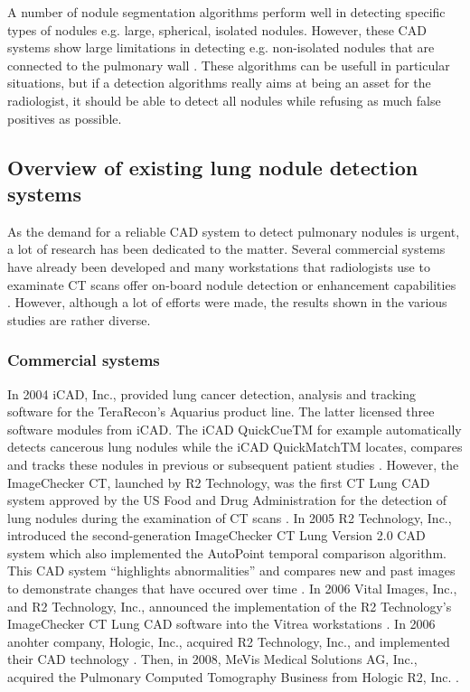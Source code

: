 A number of nodule segmentation algorithms perform well in detecting specific
types of nodules e.g. large, spherical, isolated nodules. However, these CAD
systems show large limitations in detecting e.g. non-isolated nodules that are
connected to the pulmonary wall \cite{keshani}. These algorithms can be usefull
in particular situations, but if a detection algorithms really aims at being an
asset for the radiologist, it should be able to detect all nodules while
refusing as much false positives as possible.

\subsection{Overview of existing lung nodule detection systems}
As the demand for a reliable CAD system to detect pulmonary nodules is urgent, a
lot of research has been dedicated to the matter. Several commercial systems
have already been developed and many workstations that radiologists use to
examinate CT scans offer on-board nodule detection or enhancement capabilities
\cite{ginneken}. However, although a lot of efforts were made, the results shown
in the various studies are rather diverse.

\subsubsection{Commercial systems}
In 2004 iCAD, Inc., provided lung cancer detection, analysis and tracking
software for the TeraRecon's Aquarius product line. The latter licensed three
software modules from iCAD. The iCAD QuickCueTM for example automatically
detects cancerous lung nodules while the iCAD QuickMatchTM locates, compares and tracks these
nodules in previous or subsequent patient studies \cite{tera}.
However, the ImageChecker CT, launched by R2 Technology, was the first CT Lung
CAD system approved by the US Food and Drug Administration for the detection of
lung nodules during the examination of CT scans \cite{Mevis}. In 2005 R2
Technology, Inc., introduced the second-generation ImageChecker CT Lung Version 2.0 CAD system which also implemented the AutoPoint temporal comparison algorithm. This CAD system ``highlights abnormalities'' and compares new and past images to
demonstrate changes that have occured over time \cite{diag} \cite{r2}.
In 2006 Vital Images, Inc., and R2 Technology, Inc., announced the
implementation of the R2 Technology's ImageChecker CT Lung CAD software into
the Vitrea workstations \cite{vital}. In 2006 anohter company, Hologic, Inc.,
acquired R2 Technology, Inc., and implemented their CAD technology
\cite{Hologic}. Then, in 2008, MeVis Medical Solutions AG, Inc., acquired the
Pulmonary Computed Tomography Business from Hologic R2, Inc. \cite{Mevis}. 


